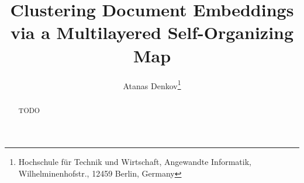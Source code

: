 \documentclass[english]{lni}
\begin{document}
\title[Clustering Document Embeddings via a Multilayered Self-Organizing Map]
{Clustering Document Embeddings via a Multilayered Self-Organizing Map}
\author[Atanas Denkov]
{Atanas Denkov\footnote{Hochschule für Technik und Wirtschaft, Angewandte Informatik, Wilhelminenhofstr., 12459 Berlin,
Germany }}

\maketitle

\begin{abstract}
TODO
\end{abstract}
    

\clearpage
\end{document}
